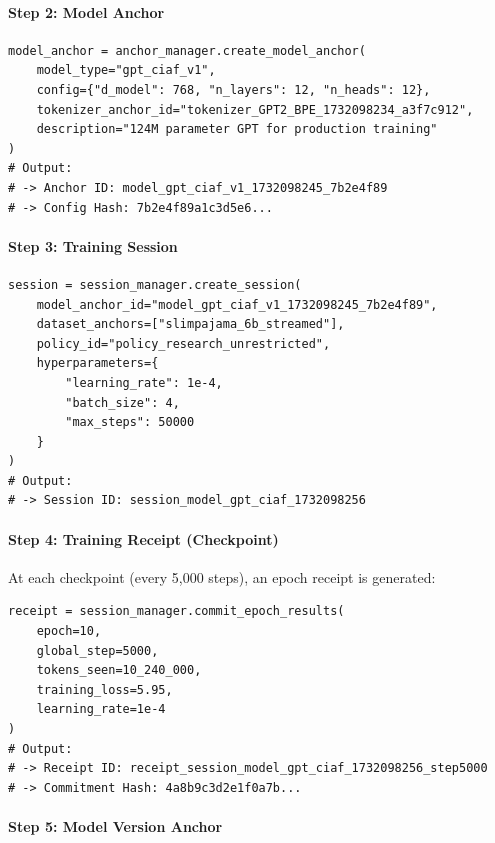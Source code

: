 \documentclass[11pt,a4paper]{article}
\begin{document}
\paragraph{Step 2: Model Anchor}
 
\begin{lstlisting}[style=ciafpython, backgroundcolor=\color{green!5}]
model_anchor = anchor_manager.create_model_anchor(
    model_type="gpt_ciaf_v1",
    config={"d_model": 768, "n_layers": 12, "n_heads": 12},
    tokenizer_anchor_id="tokenizer_GPT2_BPE_1732098234_a3f7c912",
    description="124M parameter GPT for production training"
)
# Output:
# -> Anchor ID: model_gpt_ciaf_v1_1732098245_7b2e4f89
# -> Config Hash: 7b2e4f89a1c3d5e6...
\end{lstlisting}

\paragraph{Step 3: Training Session}
 
\begin{lstlisting}[style=ciafpython, backgroundcolor=\color{orange!5}]
session = session_manager.create_session(
    model_anchor_id="model_gpt_ciaf_v1_1732098245_7b2e4f89",
    dataset_anchors=["slimpajama_6b_streamed"],
    policy_id="policy_research_unrestricted",
    hyperparameters={
        "learning_rate": 1e-4,
        "batch_size": 4,
        "max_steps": 50000
    }
)
# Output:
# -> Session ID: session_model_gpt_ciaf_1732098256
\end{lstlisting}

\paragraph{Step 4: Training Receipt (Checkpoint)}
 
At each checkpoint (every 5{,}000 steps), an epoch receipt is generated:
\begin{lstlisting}[style=ciafpython, backgroundcolor=\color{purple!5}]
receipt = session_manager.commit_epoch_results(
    epoch=10,
    global_step=5000,
    tokens_seen=10_240_000,
    training_loss=5.95,
    learning_rate=1e-4
)
# Output:
# -> Receipt ID: receipt_session_model_gpt_ciaf_1732098256_step5000
# -> Commitment Hash: 4a8b9c3d2e1f0a7b...
\end{lstlisting}

\paragraph{Step 5: Model Version Anchor}
 
\end{document}
